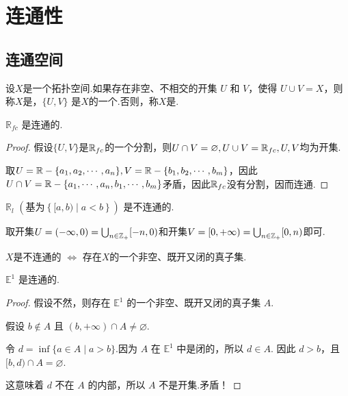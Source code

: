 \chapter{连通性}


\vspace{-1 em}
\section{连通空间}

\vspace{-1 em}
\begin{definition}[连通空间][def:7.1]
    设$X$是一个拓扑空间.如果存在非空、不相交的开集 $U$ 和 $V$，使得 $U \cup V = X$，则称$X$是，$\{U, V\}$ 是$X$的一个.否则，称$X$是.
\end{definition}

\begin{instance}
    $\mathbb{R}_{fc}$ 是连通的.
    \begin{proof}
        假设$\{U,V\}$是$\mathbb{R}_{fc}$的一个分割，则$U\cap V=\varnothing,U\cup V=\mathbb{R}_{fc},U,V$均为开集.\par
        取$U=\mathbb{R}-\{a_1,a_2,\cdots,a_n\},V=\mathbb{R}-\{b_1,b_2,\cdots,b_m\}$，因此$U\cap V=\mathbb{R}-\{a_1,\cdots,a_n,b_1,\cdots,b_m\}$矛盾，因此$\mathbb{R}_{fc}$没有分割，因而连通.
    \end{proof}
\end{instance}

\begin{instance}
    $\mathbb{R}_l$ $\left(\text{基为} \left\{[a,b) \mid a<b\right\}\right)$ 是不连通的. \par
    取开集$U=(-\infty,0)=\bigcup_{n\in\mathbb{Z_+}}[-n,0)$和开集$V=[0,+\infty)=\bigcup_{n\in\mathbb{Z}_+}[0,n)$即可.
\end{instance}

\begin{proposition}[][prop:7.1]
    $X$是不连通的 $\iff$ 存在$X$的一个非空、既开又闭的真子集.
\end{proposition}

\begin{instance}
    $\mathbb{E}^1$ 是连通的.
    \begin{proof}
        假设不然，则存在 $\mathbb{E}^1$ 的一个非空、既开又闭的真子集 $A$.\par
        假设 $b \notin A$ 且 $(b, +\infty) \cap A \neq \varnothing$.\par
        令 $d = \inf\{a \in A \mid a > b\}$.因为 $A$ 在 $\mathbb{E}^1$ 中是闭的，所以 $d \in A$.
        因此 $d > b$，且 $[b, d) \cap A = \varnothing$.\par
        这意味着 $d$ 不在 $A$ 的内部，所以 $A$ 不是开集.矛盾！
    \end{proof}
\end{instance}

